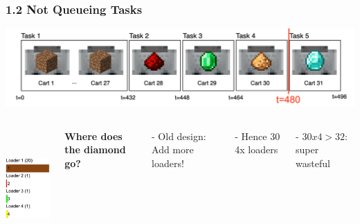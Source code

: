 \documentclass[aspectratio=169]{beamer}
\begin{document}
\begin{frame}
	\frametitle{1.2 Not Queueing Tasks}
    \includegraphics[width=1\textwidth]{example1.1.png}
    \begin{columns}

    \includegraphics[height=4.5cm]{example1result.png}

        \textbf{Where does the diamond go?}

        - Old design: Add more loaders!

        - Hence 30 4x loaders

        - $30x4 > 32$: super wasteful

    \end{columns}

\end{frame}
\end{document}
